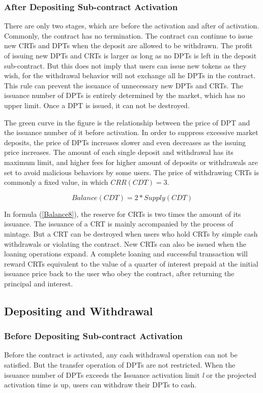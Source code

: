 \documentclass[a4paper, 10pt, conference]{ieeeconf} %
\begin{document}
\subsubsection{After Depositing Sub-contract Activation}
There are only two stages, which are before the activation and after of activation. Commonly, the contract has no termination. The contract can continue to issue new CRTs and DPTs when the deposit are allowed to be withdrawn. The profit of issuing new DPTs and CRTs is larger as long as no DPTs is left in the deposit sub-contract. But this does not imply that users can issue new tokens as they wish, for  the withdrawal behavior will not exchange all he DPTs in the contract. This rule can prevent the issuance of unnecessary new DPTs and CRTs. The issuance number of DPTs is entirely determined by the market, which has no upper limit. Once a DPT is issued, it can not be destroyed.

The green curve in the figure is the relationship between the price of DPT and the issuance number of it before activation. In order to suppress excessive market deposits, the price of DPTs increases slower and even decreases as the issuing price increases. The amount of each single deposit and withdrawal has its maximum limit, and higher fees for higher amount of deposits or withdrawals are set to avoid malicious behaviors by some users. The price of withdrawing CRTs is commonly a fixed value, in which ${CRR(CDT) = 3}$.

\begin{equation}\label{Balance8}
{Balance(CDT) = 2 * Supply(CDT)}
\end{equation}

In formula (\ref{Balance8}), the reserve for CRTs is two times the amount of its issuance. The issuance of a CRT is mainly accompanied by the process of mintage. But a CRT can be destroyed when users who hold CRTs by simple cash withdrawals or violating the contract. New CRTs can also be issued when the loaning operations expand. A complete loaning and successful transaction will reward CRTs equivalent to the value of a quarter of interest prepaid at the initial issuance price back to the user who obey the contract, after returning the principal and interest.

\subsection{Depositing and Withdrawal}
\subsubsection{Before Depositing Sub-contract Activation}
Before the contract is activated, any cash withdrawal operation can not be satisfied. But the transfer operation of DPTs are not restricted. When the issuance number of DPTs exceeds the Issuance activation limit \emph{l} or the projected activation time is up, users can withdraw their DPTs to cash.
\end{document}
